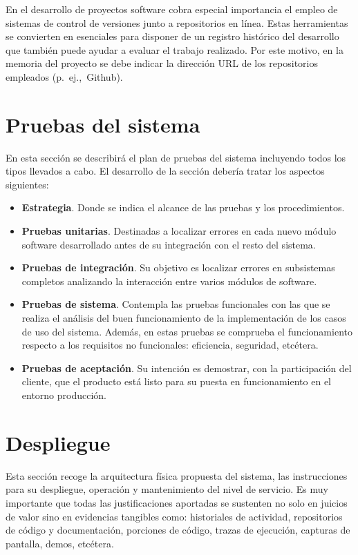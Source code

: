 En el desarrollo de proyectos software cobra especial importancia el empleo de sistemas de control de versiones junto a repositorios en línea. Estas herramientas se convierten en esenciales para disponer de un registro histórico del desarrollo que también puede ayudar a evaluar el trabajo realizado. Por este motivo, en la memoria del proyecto se debe indicar la dirección URL de los repositorios empleados (p.~ej.,~Github).

\section{Pruebas del sistema}
En esta sección se describirá el plan de pruebas del sistema incluyendo todos los tipos llevados a cabo. El desarrollo de la sección debería tratar los aspectos siguientes:
\begin{itemize}[noitemsep]
\item \textbf{Estrategia}. Donde se indica el alcance de las pruebas y los procedimientos.

\item \textbf{Pruebas unitarias}. Destinadas a localizar errores en cada nuevo módulo software desarrollado antes de su integración con el resto del sistema.

\item \textbf{Pruebas de integración}. Su objetivo es localizar errores en subsistemas completos analizando la interacción entre varios módulos de software.

\item \textbf{Pruebas de sistema}. Contempla las pruebas funcionales con las que se realiza el análisis del buen funcionamiento de la implementación de los casos de uso del sistema. Además, en estas pruebas se comprueba el funcionamiento respecto a los requisitos no funcionales: eficiencia, seguridad, etcétera.

\item \textbf{Pruebas de aceptación}. Su intención es demostrar, con la participación del cliente, que el producto está listo para su puesta en funcionamiento en el entorno producción.
\end{itemize}

\section{Despliegue}
Esta sección recoge la arquitectura física propuesta del sistema, las instrucciones para su despliegue, operación y mantenimiento del
nivel de servicio. Es muy importante que todas las justificaciones aportadas se sustenten no solo en juicios de valor sino en evidencias tangibles como: historiales de actividad, repositorios de código y documentación, porciones de código, trazas de ejecución, capturas de pantalla, demos, etcétera.
